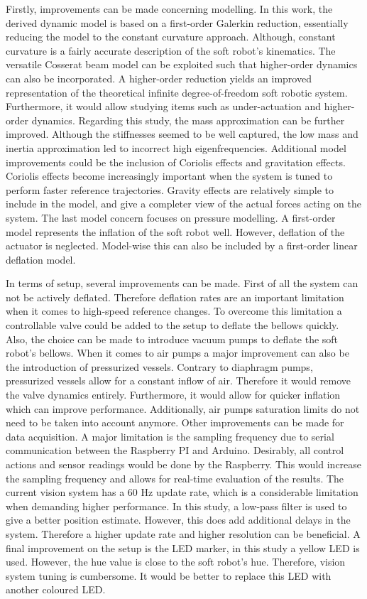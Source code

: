 Firstly, improvements can be made concerning modelling. In this work, the derived dynamic model is based on a first-order Galerkin reduction, essentially reducing the model to the constant curvature approach. Although, constant curvature is a fairly accurate description of the soft robot's kinematics. The versatile Cosserat beam model can be exploited such that higher-order dynamics can also be incorporated. A higher-order reduction yields an improved representation of the theoretical infinite degree-of-freedom soft robotic system. Furthermore, it would allow studying items such as under-actuation and higher-order dynamics. Regarding this study, the mass approximation can be further improved. Although the stiffnesses seemed to be well captured, the low mass and inertia approximation led to incorrect high eigenfrequencies. Additional model improvements could be the inclusion of Coriolis effects and gravitation effects. Coriolis effects become increasingly important when the system is tuned to perform faster reference trajectories. Gravity effects are relatively simple to include in the model, and give a completer view of the actual forces acting on the system. The last model concern focuses on pressure modelling. A first-order model represents the inflation of the soft robot well. However, deflation of the actuator is neglected. Model-wise this can also be included by a first-order linear deflation model. 

In terms of setup, several improvements can be made. First of all the system can not be actively deflated. Therefore deflation rates are an important limitation when it comes to high-speed reference changes. To overcome this limitation a controllable valve could be added to the setup to deflate the bellows quickly. Also, the choice can be made to introduce vacuum pumps to deflate the soft robot's bellows. When it comes to air pumps a major improvement can also be the introduction of pressurized vessels. Contrary to diaphragm pumps, pressurized vessels allow for a constant inflow of air. Therefore it would remove the valve dynamics entirely. Furthermore, it would allow for quicker inflation which can improve performance. Additionally, air pumps saturation limits do not need to be taken into account anymore. Other improvements can be made for data acquisition. A major limitation is the sampling frequency due to serial communication between the Raspberry PI and Arduino. Desirably, all control actions and sensor readings would be done by the Raspberry. This would increase the sampling frequency and allows for real-time evaluation of the results. The current vision system has a 60 Hz update rate, which is a considerable limitation when demanding higher performance. In this study, a low-pass filter is used to give a better position estimate. However, this does add additional delays in the system. Therefore a higher update rate and higher resolution can be beneficial. A final improvement on the setup is the LED marker, in this study a yellow LED is used. However, the hue value is close to the soft robot's hue. Therefore, vision system tuning is cumbersome. It would be better to replace this LED with another coloured LED. 



